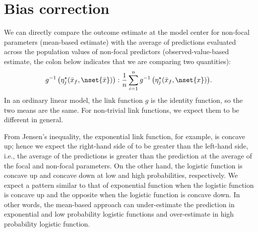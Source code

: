 
\section{Bias correction}


We can directly compare the outcome estimate at the model center for non-focal parameters (mean-based estimate) with the average of predictions evaluated across the population values of non-focal predictors (observed-value-based estimate, the colon below indicates that we are comparing two quantities):
%
\begin{align}\label{eq:compare_anchored_pop_based}
g^{-1} \left(\eta_j^\star(\bar{x}_f, \nset{\bar{x}})\right) : \frac{1}{n} \sum_{i=1}^n{ g^{-1} \left(\eta_j^\star(\bar{x}_f, \nset{x})\right)}.
\end{align}
%
In an ordinary linear model, the link function $g$ is the identity function, so the two means are the same. For non-trivial link functions, we expect them to be different in general.

From Jensen's inequality, the exponential link function, for example, is concave up; hence we expect the right-hand side of  to be greater than the left-hand side, i.e., the average of the predictions is greater than the prediction at the average of the focal and non-focal parameters. On the other hand, the logistic function is concave up and concave down at low and high probabilities, respectively. We expect a pattern similar to that of exponential function when the logistic function is concave up and the opposite when the logistic function is concave down. In other words, the mean-based approach can under-estimate the prediction in exponential and low probability logistic functions and over-estimate in high probability logistic function.

